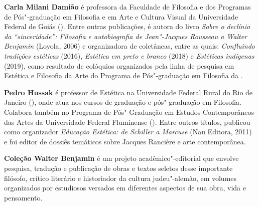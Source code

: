 
\textbf{Carla Milani Damião} é professora da Faculdade de Filosofia e dos Programas de Pós"-graduação em Filosofia e em Arte e Cultura Visual da Universidade Federal de Goiás ().
Entre outras publicações, é autora do livro \emph{Sobre o declínio da ``sinceridade'': Filosofia e
autobiografia de Jean"-Jacques Rousseau a Walter Benjamin} (Loyola, 2006) e organizadora de
coletâneas, entre as quais: \emph{Confluindo tradições estéticas} (2016), \emph{Estética em preto e branco} (2018) e \emph{Estéticas indígenas} (2019), como resultado de colóquios organizados pela linha de pesquisa em Estética e Filosofia da Arte do Programa de Pós"-graduação em Filosofia da .

\textbf{Pedro Hussak} é professor de Estética na Universidade Federal Rural do
Rio de Janeiro (), onde atua nos cursos de graduação e pós"-graduação em Filosofia.
Colabora também no Programa de Pós"-Graduação em Estudos Contemporâneos das Artes da
Universidade Federal Fluminense (). Entre outros títulos, publicou como organizador \emph{Educação Estética: de Schiller a Marcuse} (Nau Editora, 2011) e foi editor de dossiês temáticos sobre Jacques Rancière e arte contemporânea.

\textbf{Coleção Walter Benjamin} é um projeto acadêmico"-editorial que envolve pesquisa, tradução e publicação de obras e textos seletos desse importante filósofo, crítico literário e historiador da cultura judeu"-alemão, em volumes organizados por estudiosos versados em diferentes aspectos de sua obra, vida e pensamento. 

